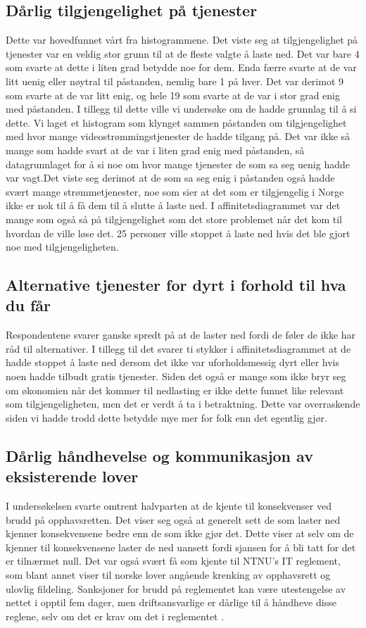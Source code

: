\subsection{Dårlig tilgjengelighet på tjenester}
Dette var hovedfunnet vårt fra histogrammene. Det viste seg at tilgjengelighet på tjenester var en veldig stor grunn til at de fleste valgte å laste ned. Det var bare 4 som svarte at dette i liten grad betydde noe for dem. Enda færre svarte at de var litt uenig eller nøytral til påstanden, nemlig bare 1 på hver. Det var derimot 9 som svarte at de var litt enig, og hele 19 som svarte at de var i stor grad enig med påstanden. 
I tillegg til dette ville vi undersøke om de hadde grunnlag til å si dette. Vi laget et histogram som klynget sammen påstanden om tilgjengelighet med hvor mange videostrømmingstjenester de hadde tilgang på. Det var ikke så mange som hadde svart at de var i liten grad enig med påstanden, så datagrunnlaget for å si noe om hvor mange tjenester de som sa seg uenig hadde var vagt.Det viste seg derimot at de som sa seg enig i påstanden også hadde svært mange strømmetjenester, noe som sier at det som er tilgjengelig i Norge ikke er nok til å få dem til å slutte å laste ned. 
I affinitetsdiagrammet var det mange som også så på tilgjengelighet som det store problemet når det kom til hvordan de ville løse det. 25 personer ville stoppet å laste ned hvis det ble gjort noe med tilgjengeligheten. 

\subsection{Alternative tjenester for dyrt i forhold til hva du får}
Respondentene svarer ganske spredt på at de laster ned fordi de føler de ikke har råd til alternativer. I tillegg til det svarer ti stykker i affinitetsdiagrammet at de hadde stoppet å laste ned dersom det ikke var uforholdsmessig dyrt eller hvis noen hadde tilbudt gratis tjenester. Siden det også er mange som ikke bryr seg om økonomien når det kommer til nedlasting er ikke dette funnet like relevant som tilgjengeligheten, men det er verdt å ta i betraktning. Dette var overraskende siden vi hadde trodd dette betydde mye mer for folk enn det egentlig gjør. 

\subsection{Dårlig håndhevelse og kommunikasjon av eksisterende lover}
I undersøkelsen svarte omtrent halvparten at de kjente til konsekvenser ved brudd på opphavsretten. Det viser seg også at generelt sett de som laster ned kjenner konsekvensene bedre enn de som ikke gjør det. Dette viser at selv om de kjenner til konsekvensene laster de ned uansett fordi sjansen for å bli tatt for det er tilnærmet null. Det var også svært få som kjente til NTNU's IT reglement, som blant annet viser til norske lover angående krenking av opphavsrett og ulovlig fildeling. Sanksjoner for brudd på reglementet kan være utestengelse av nettet i opptil fem dager, men driftsansvarlige er dårlige til å håndheve disse reglene, selv om det er krav om det i reglementet \cite{ITReg}. 